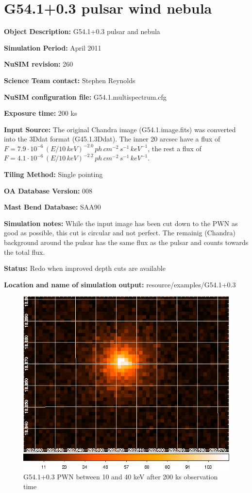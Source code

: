 
\newpage

\section{G54.1+0.3 pulsar wind nebula}

\textbf{Object Description:} G54.1+0.3 pulsar and nebula

\textbf{Simulation Period:} April 2011

\textbf{NuSIM revision:} 260

\textbf{Science Team contact:} Stephen Reynolds

\textbf{NuSIM configuration file:} G54.1.multispectrum.cfg

\textbf{Exposure time:} 200 ks

\textbf{Input Source:} 
The original Chandra image (G54.1.image.fits) was converted into the 3Ddat format (G45.1.3Ddat).
The inner 20 arcsec have a flux of $F = 7.9\cdot10^{-6}\,(E/10\,keV)^{-2.0}\,ph\,cm^{-2}\,s^{-1}\,keV^{-1}$, the rest a flux of $F = 4.1\cdot10^{-6}\,(E/10\,keV)^{-2.2}\,ph\,cm^{-2}\,s^{-1}\,keV^{-1}$.

\textbf{Tiling Method:} Single pointing

\textbf{OA Database Version:} 008

\textbf{Mast Bend Database:} SAA90

\textbf{Simulation notes:} While the input image has been cut down to the PWN as good as possible, this cut is circular and not perfect. The remainig (Chandra) background around the pulsar has the same flux as the pulsar and counts towards the total flux.

\textbf{Status:} 
Redo when improved depth cuts are available

\textbf{Location and name of simulation output:} resource/examples/G54.1+0.3

\begin{figure}[h]
\begin{center}
\includegraphics[width=12cm]{G54.1+0.3/G54.png}
\caption{G54.1+0.3 PWN between 10 and 40 keV after 200 ks observation time}
\label{Vela} 
\end{center}
\end{figure}

